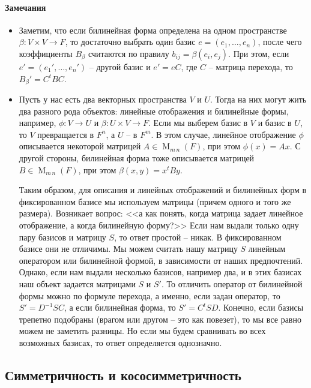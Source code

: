 \paragraph{Замечания}
\begin{itemize}
\item Заметим, что если билинейная форма определена на одном пространстве $\beta\colon V\times V\to F$, то достаточно выбрать один базис $e=(e_1,\ldots,e_n)$, после чего коэффициенты $B_\beta$ считаются по правилу $b_{ij} = \beta(e_i,e_j)$. При этом, если $e'=(e_1',\ldots,e_n')$ -- другой базис и $e'=eC$, где $C$ -- матрица перехода, то $B_\beta' = C^t B C$.

\item Пусть у нас есть два векторных пространства $V$ и $U$. Тогда на них могут жить два разного рода объектов: линейные отображения и билинейные формы, например, $\phi\colon V\to U$ и $\beta\colon U\times V \to F$. Если мы выберем базис в $V$ и базис в $U$, то $V$ превращается в $F^n$, а $U$ -- в $F^m$. В этом случае, линейное отображение $\phi$ описывается некоторой матрицей $A\in\operatorname{M}_{m\,n}(F)$, при этом $\phi(x) = Ax$. С другой стороны, билинейная форма тоже описывается матрицей $B\in \operatorname{M}_{m\,n}(F)$, при этом $\beta(x,y) = x^tBy$.

Таким образом, для описания и линейных отображений и билинейных форм в фиксированном базисе мы используем матрицы (причем одного и того же размера). Возникает вопрос: <<а как понять,  когда матрица задает линейное отображение, а когда билинейную форму?>> Если  нам выдали только одну пару базисов и матрицу $S$, то ответ простой -- никак. В фиксированном базисе они не отличимы. Мы можем считать нашу матрицу $S$ линейным оператором или билинейной формой, в зависимости от наших предпочтений. Однако, если нам выдали несколько базисов, например два, и в этих базисах наш объект задается матрицами $S$ и $S'$. То отличить оператор от билинейной формы можно по формуле перехода, а именно, если задан оператор, то $S' = D^{-1}S C$, а если билинейная форма, то $S' = C^t S D$. Конечно, если базисы трепетно подобраны (врагом или другом -- это как повезет), то мы все равно можем не заметить разницы. Но если мы будем сравнивать во всех возможных базисах, то ответ определяется однозначно.
\end{itemize}

\subsection{Симметричность и кососимметричность}

